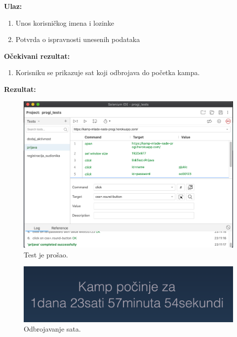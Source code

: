 			\textbf{Ulaz:}
			\begin{enumerate}
			    \item Unos korisničkog imena i lozinke
			    \item Potvrda o ispravnosti unesenih podataka
			\end{enumerate}
			
			\textbf{Očekivani rezultat:}
			
			\begin{enumerate}
			    \item Korisniku se prikazuje sat koji odbrojava do početka kampa.
			\end{enumerate}
			
			\textbf{Rezultat:} 
			
			\begin{figure}[H]
            \includegraphics[scale=0.5]{dokumentacija/slike/PRIJAVA_SUDIONIKA.png} %
            \centering
            Test je prošao.
            \label{fig:promjene}
            \end{figure}
            
            \begin{figure}[H]
            \includegraphics[scale=0.43]{dokumentacija/slike/ODBROJAVANJE_SAT_23.26.10.png} %
            \centering
            Odbrojavanje sata.
            \label{fig:promjene}
            \end{figure}
			
